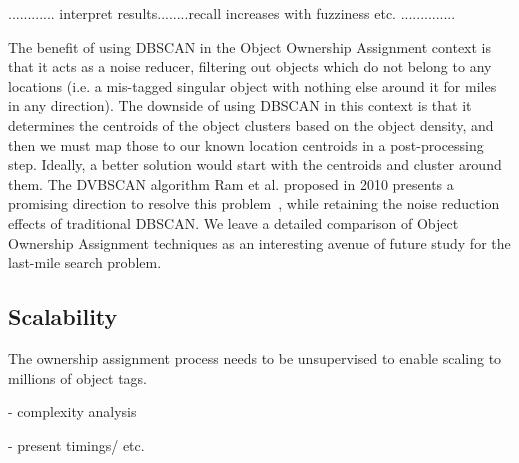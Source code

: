 ............ interpret results........recall increases with fuzziness etc. ..............

The benefit of using DBSCAN in the Object Ownership Assignment context is that it acts as a noise reducer, filtering out objects which do not belong to any locations (i.e. a mis-tagged singular object with nothing else around it for miles in any direction). 
The downside of using DBSCAN in this context is that it determines the centroids of the object clusters based on the object density, and then we must map those to our known location centroids in a post-processing step. 
Ideally, a better solution would start with the centroids and cluster around them. 
The DVBSCAN algorithm Ram et al. proposed in 2010 presents a promising direction to resolve this problem~\cite{Ram2010}, while retaining the noise reduction effects of traditional DBSCAN. 
We leave a detailed comparison of Object Ownership Assignment techniques as an interesting avenue of future study for the last-mile search problem.


\subsection{Scalability}
The ownership assignment process needs to be unsupervised to enable scaling to millions of object tags. 

- complexity analysis

- present timings/ etc.








